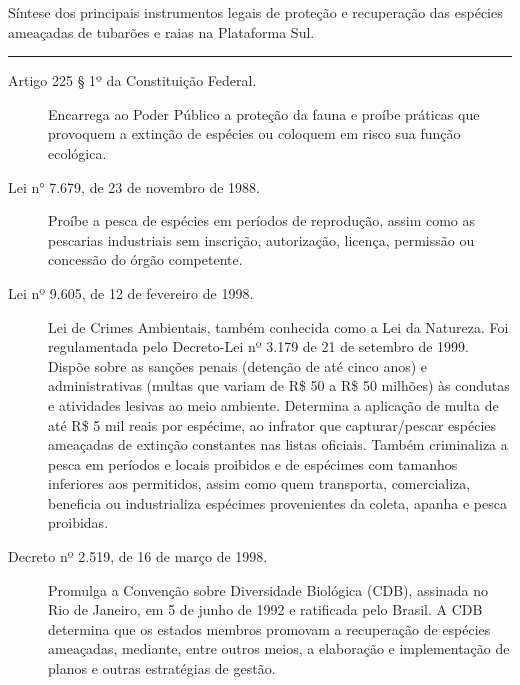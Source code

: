 \documentclass[a4paper,11pt,twoside,showtrims,onecolumn,openright,final]{memoir}
\begin{document}

%
%

\begin{table}
\caption{Síntese dos principais instrumentos legais de proteção e recuperação
         das espécies ameaçadas de tubarões e raias na Plataforma Sul.}
\label{tab:quadro-legislacoes}	 
\rule{\textwidth}{\normalrulethickness}
\begin{small}
\begin{description}
			      
\item[Artigo 225 § 1º da Constituição Federal.] Encarrega ao Poder Público a proteção da fauna e proíbe
                              práticas que provoquem a extinção de espécies ou coloquem em risco sua função ecológica.
							 
\item[Lei n° 7.679, de 23 de novembro de 1988.] Proíbe a pesca de espécies em períodos de reprodução, 
					       assim como as pescarias industriais
					       sem inscrição, autorização, licença, permissão 
					       ou concessão do órgão competente.
							  
\item[Lei nº 9.605, de 12 de fevereiro de 1998.] Lei de Crimes Ambientais, também conhecida como a Lei da Natureza. Foi regulamentada
						pelo Decreto-Lei nº 3.179 de 21 de setembro de 1999.
                                                Dispõe sobre as sanções penais (detenção de até cinco anos) e administrativas 
						(multas que variam de R\$ 50 a R\$ 50 milhões) às condutas 
						e atividades lesivas ao meio ambiente. Determina a aplicação de multa de até
						R\$ 5 mil reais por espécime, ao infrator que capturar/pescar espécies ameaçadas 
						de extinção constantes nas listas oficiais. Também criminaliza a pesca em períodos
						e locais proibidos e de espécimes com tamanhos inferiores aos permitidos, 
						assim como quem transporta, comercializa, beneficia ou industrializa espécimes 
						provenientes da coleta, apanha e pesca proibidas.

\item[Decreto nº 2.519, de 16 de março de 1998.] Promulga a Convenção sobre Diversidade Biológica (CDB), 
                                                assinada no Rio de Janeiro, em 5 de junho de 1992
						e ratificada pelo Brasil. A CDB determina que os estados
						membros promovam a recuperação de espécies ameaçadas, 
						mediante, entre outros meios, a elaboração e implementação de
						planos e outras estratégias de gestão.
						

\end{description}
\end{small}
\end{table}
\end{document}
